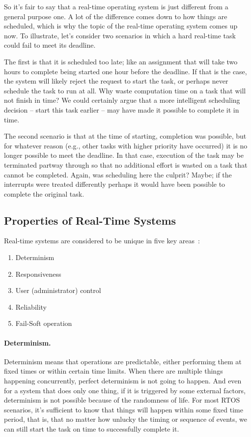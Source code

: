 So it's fair to say that a real-time operating system is just different from a general purpose one. A lot of the difference comes down to how things are scheduled, which is why the topic of the real-time operating system comes up now. To illustrate, let's consider two scenarios in which a hard real-time task could fail to meet its deadline. 

The first is that it is scheduled too late; like an assignment that will take two hours to complete being started one hour before the deadline. If that is the case, the system will likely reject the request to start the task, or perhaps never schedule the task to run at all. Why waste computation time on a task that will not finish in time? We could certainly argue that a more intelligent scheduling decision -- start this task earlier -- may have made it possible to complete it in time.

The second scenario is that at the time of starting, completion was possible, but for whatever reason (e.g., other tasks with higher priority have occurred) it is no longer possible to meet the deadline. In that case, execution of the task may be terminated partway through so that no additional effort is wasted on a task that cannot be completed. Again, was scheduling here the culprit? Maybe; if the interrupts were treated differently perhaps it would have been possible to complete the original task.

\subsection*{Properties of Real-Time Systems}
Real-time systems are considered to be unique in five key areas~\cite{osi}:

\begin{enumerate}
	\item Determinism
	\item Responsiveness
	\item User (administrator) control
	\item Reliability
	\item Fail-Soft operation
\end{enumerate}

\paragraph{Determinism.} Determinism means that operations are predictable, either performing them at fixed times or within certain time limits. When there are multiple things happening concurrently, perfect determinism is not going to happen. And even for a system that does only one thing, if it is triggered by some external factors, determinism is not possible because of the randomness of life. For most RTOS scenarios, it's sufficient to know that things will happen within some fixed time period, that is, that no matter how unlucky the timing or sequence of events, we can still start the task on time to successfully complete it.

